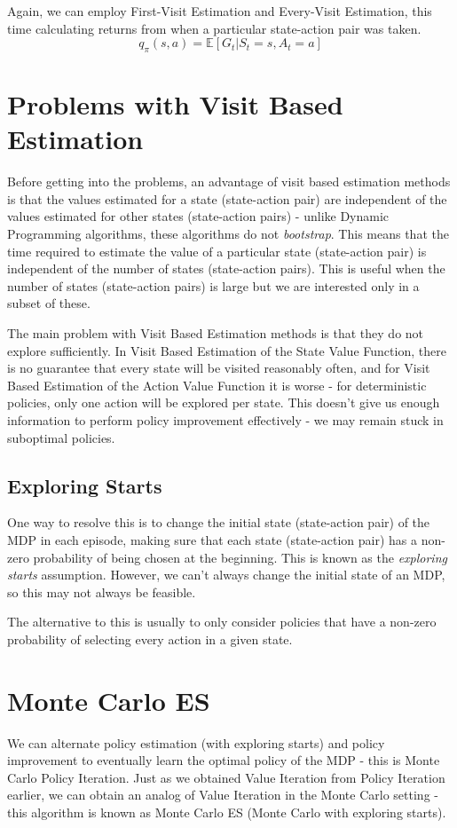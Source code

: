 \documentclass[12pt]{report}
\begin{document}
Again, we can employ First-Visit Estimation and Every-Visit Estimation, this time calculating returns from when a particular state-action pair was taken.
\begin{equation}
    q_{\pi}(s, a) = \mathbb{E}[G_{t} | S_{t} = s, A_{t} = a]
\end{equation}

\section{Problems with Visit Based Estimation}
Before getting into the problems, an advantage of visit based estimation methods is that the values estimated for a state (state-action pair) are independent of the values estimated for other states (state-action pairs) - unlike Dynamic Programming algorithms, these algorithms do not \textit{bootstrap}. This means that the time required to estimate the value of a particular state (state-action pair) is independent of the number of states (state-action pairs). This is useful when the number of states (state-action pairs) is large but we are interested only in a subset of these.

The main problem with Visit Based Estimation methods is that they do not explore sufficiently. In Visit Based Estimation of the State Value Function, there is no guarantee that every state will be visited reasonably often, and for Visit Based Estimation of the Action Value Function it is worse - for deterministic policies, only one action will be explored per state. This doesn't give us enough information to perform policy improvement effectively - we may remain stuck in suboptimal policies.

\subsection{Exploring Starts}
One way to resolve this is to change the initial state (state-action pair) of the MDP in each episode, making sure that each state (state-action pair) has a non-zero probability of being chosen at the beginning. This is known as the \textit{exploring starts} assumption. However, we can't always change the initial state of an MDP, so this may not always be feasible.

The alternative to this is usually to only consider policies that have a non-zero probability of selecting every action in a given state. 

\section{Monte Carlo ES}
We can alternate policy estimation (with exploring starts) and policy improvement to eventually learn the optimal policy of the MDP - this is Monte Carlo Policy Iteration. Just as we obtained Value Iteration from Policy Iteration earlier, we can obtain an analog of Value Iteration in the Monte Carlo setting - this algorithm is known as Monte Carlo ES (Monte Carlo with exploring starts).
\end{document}
